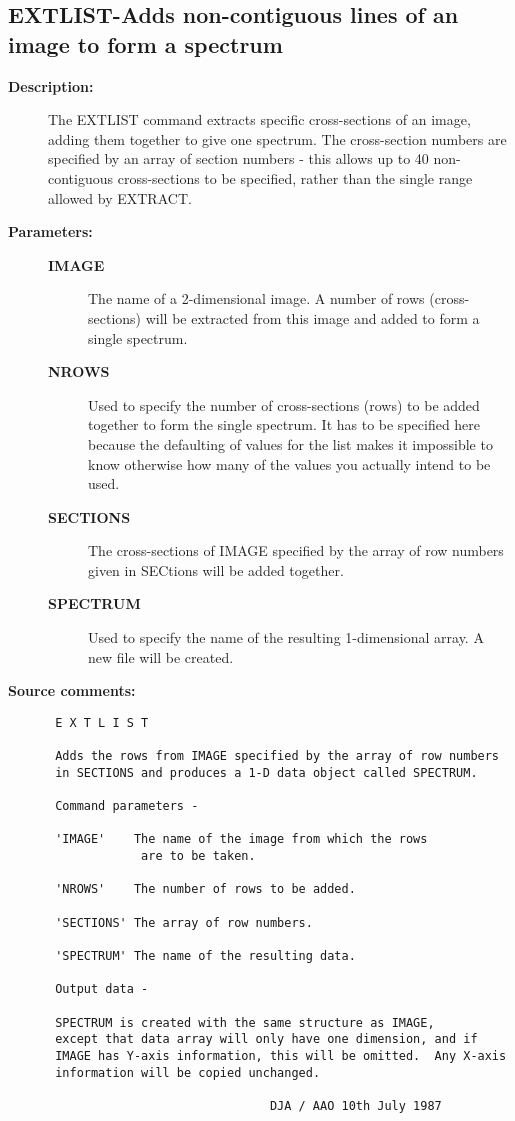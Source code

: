 \subsection{EXTLIST-\label{EXTLIST}Adds non-contiguous lines of an image to form a spectrum}
\begin{description}

\item [{\bf Description:}]
 The EXTLIST command extracts specific cross-sections of an image,
 adding them together to give one spectrum.  The cross-section
 numbers are specified by an array of section numbers - this allows
 up to 40 non-contiguous cross-sections to be specified, rather
 than the single range allowed by EXTRACT.

\item [{\bf Parameters:}]
\begin{description}
\item [{\bf IMAGE}]
 The name of a 2-dimensional image.  A number of rows
 (cross-sections) will be extracted from this image and
 added to form a single spectrum.
\item [{\bf NROWS}]
 Used to specify the number of cross-sections (rows) to
 be added together to form the single spectrum.
 It has to be specified here because the defaulting of
 values for the list makes it impossible to know otherwise
 how many of the values you actually intend to be used.
\item [{\bf SECTIONS}]
 The cross-sections of IMAGE specified by the array of
 row numbers given in SECtions will be added together.
\item [{\bf SPECTRUM}]
 Used to specify the name of the resulting 1-dimensional
 array.  A new file will be created.
\end{description}

\item [{\bf Source comments:}]
\begin{verbatim}
 E X T L I S T

 Adds the rows from IMAGE specified by the array of row numbers
 in SECTIONS and produces a 1-D data object called SPECTRUM.

 Command parameters -

 'IMAGE'    The name of the image from which the rows
             are to be taken.

 'NROWS'    The number of rows to be added.

 'SECTIONS' The array of row numbers.

 'SPECTRUM' The name of the resulting data.

 Output data -

 SPECTRUM is created with the same structure as IMAGE,
 except that data array will only have one dimension, and if
 IMAGE has Y-axis information, this will be omitted.  Any X-axis
 information will be copied unchanged.

                               DJA / AAO 10th July 1987
\end{verbatim}
\end{description}

